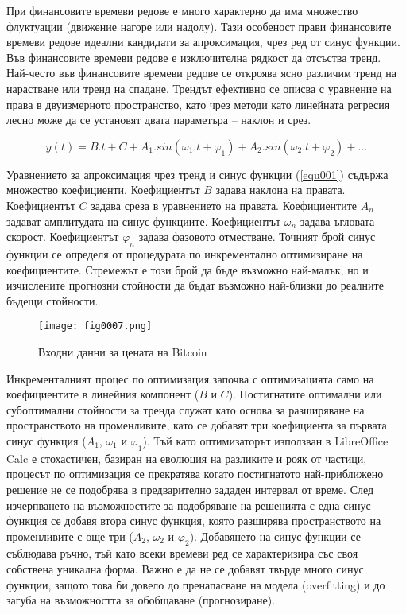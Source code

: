 При финансовите времеви редове е много характерно да има множество флуктуации (движение нагоре или надолу). Тази особеност прави финансовите времеви редове идеални кандидати за апроксимация, чрез ред от синус функции. Във финансовите времеви редове е изключителна рядкост да отсъства тренд. Най-често във финансовите времеви редове се откроява ясно различим тренд на нарастване или тренд на спадане. Трендът ефективно се описва с уравнение на права в двуизмерното пространство, като чрез методи като линейната регресия лесно може да се установят двата параметъра – наклон и срез. 

\begin{equation}  \label{equ001}
y(t) = B.t + C + A_1.sin(\omega_1.t+\varphi_1) + A_2.sin(\omega_2.t+\varphi_2) + ...
\end{equation}

Уравнението за апроксимация чрез тренд и синус функции (\ref{equ001}) съдържа множество коефициенти. Коефициентът $B$ задава наклона на правата. Коефициентът $C$ задава среза в уравнението на правата. Коефициентите $A_n$ задават амплитудата на синус функциите. Коефициентът $\omega_n$ задава ъгловата скорост. Коефициентът $\varphi_n$ задава фазовото отместване. Точният брой синус функции се определя от процедурата по инкрементално оптимизиране на коефициентите. Стремежът е този брой да бъде възможно най-малък, но и изчислените прогнозни стойности да бъдат възможно най-близки до реалните бъдещи стойности. 

\begin{figure}[H]
  \centering
  \texttt{[image: fig0007.png]}
  \caption{Входни данни за цената на Bitcoin}
\label{fig0007}
\end{figure}

Инкременталният процес по оптимизация започва с оптимизацията само на коефициентите в линейния компонент ($B$ и $C$). Постигнатите оптимални или субоптимални стойности за тренда служат като основа за разширяване на пространството на променливите, като се добавят три коефициента за първата синус функция ($A_1$, $\omega_1$ и $\varphi_1$). Тъй като оптимизаторът използван в LibreOffice Calc е стохастичен, базиран на еволюция на разликите и рояк от частици, процесът по оптимизация се прекратява когато постигнатото най-приближено решение не се подобрява в предварително зададен интервал от време. След изчерпването на възможностите за подобряване на решенията с една синус функция се добавя втора синус функция, която разширява пространството на променливите с още три ($A_2$, $\omega_2$ и $\varphi_2$). Добавянето на синус функции се съблюдава ръчно, тъй като всеки времеви ред се характеризира със своя собствена уникална форма. Важно е да не се добавят твърде много синус функции, защото това би довело до пренапасване на модела (overfitting) и до загуба на възможността за обобщаване (прогнозиране).

